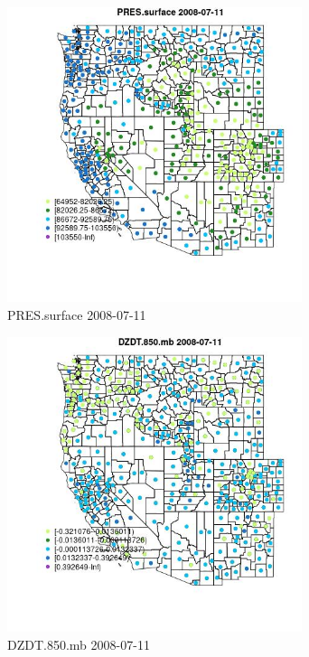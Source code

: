 \begin{figure} 
\centering  
\includegraphics[width=0.77\textwidth]{Code_Outputs/df_report_ML_predictors_CountyCentroid_Locations_Dates_2008-01-01to2018-12-31_MapObsPRESsurface2008-07-11.jpg} 
\caption{\label{fig:df_report_ML_predictors_CountyCentroid_Locations_Dates_2008-01-01to2018-12-31MapObsPRESsurface2008-07-11}PRES.surface 2008-07-11} 
\end{figure} 
 

\begin{figure} 
\centering  
\includegraphics[width=0.77\textwidth]{Code_Outputs/df_report_ML_predictors_CountyCentroid_Locations_Dates_2008-01-01to2018-12-31_MapObsDZDT850mb2008-07-11.jpg} 
\caption{\label{fig:df_report_ML_predictors_CountyCentroid_Locations_Dates_2008-01-01to2018-12-31MapObsDZDT850mb2008-07-11}DZDT.850.mb 2008-07-11} 
\end{figure} 
 

